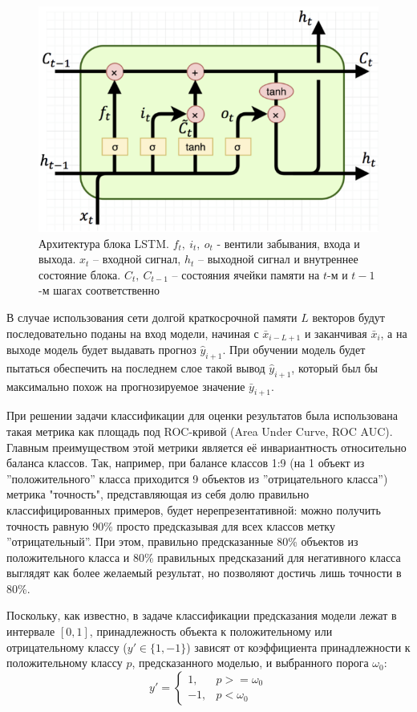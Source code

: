 \begin{figure}
  \centering
  \includegraphics[width=.7\linewidth]{images/lstm_arch.png}
  \caption{Архитектура блока LSTM. $f_t,\ i_t,\ o_t$ - вентили забывания, входа и выхода. $x_t$ -- входной сигнал, $h_t$ -- выходной сигнал и внутреннее состояние блока. $C_t,\ C_{t-1}$ -- состояния ячейки памяти на $t$-м и $t-1$-м шагах соответственно}
  \label{fig:lstm_arch}
\end{figure}


В случае использования сети долгой краткосрочной памяти $L$ векторов будут последовательно поданы на вход модели, начиная с  $\bar{x}_{i-L+1}$ и заканчивая $\bar{x}_{i}$, а на выходе модель будет выдавать прогноз $\hat{y}_{i+1}$. При обучении модель будет пытаться обеспечить на последнем слое такой вывод $\hat{y}_{i+1}$, который был бы максимально похож на прогнозируемое значение $\bar{y}_{i+1}$.

При решении задачи классификации для оценки результатов была использована такая метрика как площадь под ROC-кривой (Area Under Curve, ROC AUC). Главным преимуществом этой метрики является её инвариантность относительно баланса классов. Так, например, при балансе классов 1:9 (на 1 объект из ''положительного'' класса приходится 9 объектов из ''отрицательного класса'') метрика "точность", представляющая из себя долю правильно классифицированных примеров, будет нерепрезентативной: можно получить точность равную 90\% просто предсказывая для всех классов метку ''отрицательный''. При этом, правильно предсказанные 80\% объектов из положительного класса и 80\% правильных предсказаний для негативного класса выглядят как более желаемый результат, но позволяют достичь лишь точности в 80\%.

Поскольку, как известно, в задаче классификации предсказания модели лежат в интервале $[0, 1]$, принадлежность объекта к положительному или отрицательному классу ($y' \in \{1, -1\}$) зависят от коэффициента принадлежности к положительному классу $p$, предсказанного моделью, и выбранного порога $\omega_0$:
$$
y' =    \begin{cases}
			1, & p >= \omega_0\\
            -1, & p < \omega_0
	    \end{cases}
$$

